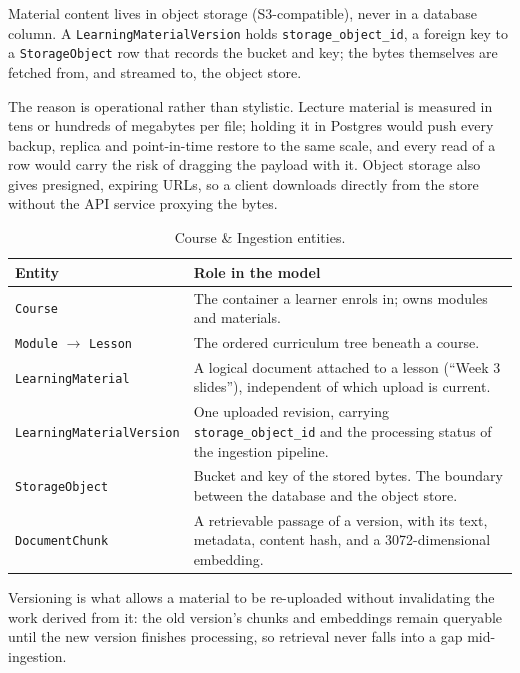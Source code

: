 Material content lives in object storage (S3-compatible), never in a database column. A \texttt{LearningMaterialVersion} holds \texttt{storage\_object\_id}, a foreign key to a \texttt{StorageObject} row that records the bucket and key; the bytes themselves are fetched from, and streamed to, the object store.

The reason is operational rather than stylistic. Lecture material is measured in tens or hundreds of megabytes per file; holding it in Postgres would push every backup, replica and point-in-time restore to the same scale, and every read of a row would carry the risk of dragging the payload with it. Object storage also gives presigned, expiring URLs, so a client downloads directly from the store without the API service proxying the bytes.

\begin{table}[H]
\centering
\renewcommand{\arraystretch}{1.25}
\small
\begin{tabular}{|>{\raggedright\arraybackslash}m{}|>{\raggedright\arraybackslash}m{}|}
\hline
\textbf{Entity} & \textbf{Role in the model} \\ \hline
\texttt{Course} & The container a learner enrols in; owns modules and materials. \\ \hline
\texttt{Module} $\rightarrow$ \texttt{Lesson} & The ordered curriculum tree beneath a course. \\ \hline
\texttt{LearningMaterial} & A logical document attached to a lesson (``Week 3 slides''), independent of which upload is current. \\ \hline
\texttt{LearningMaterialVersion} & One uploaded revision, carrying \texttt{storage\_object\_id} and the processing status of the ingestion pipeline. \\ \hline
\texttt{StorageObject} & Bucket and key of the stored bytes. The boundary between the database and the object store. \\ \hline
\texttt{DocumentChunk} & A retrievable passage of a version, with its text, metadata, content hash, and a 3072-dimensional embedding. \\ \hline
\end{tabular}
\caption{Course \& Ingestion entities.}
\label{tab:class_ingestion}
\end{table}

\noindent Versioning is what allows a material to be re-uploaded without invalidating the work derived from it: the old version's chunks and embeddings remain queryable until the new version finishes processing, so retrieval never falls into a gap mid-ingestion.

